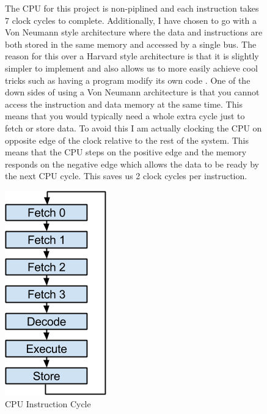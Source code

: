 \documentclass[10pt]{article}
\begin{document}
        \begin{figure}[H]
            \centering
            \begin{minipage}[t]{.7\textwidth}
                \vspace{0pt}
                The CPU for this project is non-piplined and each instruction
                takes 7 clock cycles to complete.  Additionally, I have chosen
                to go with a Von Neumann style architecture \cite{von} where
                the data and instructions are both stored in the same memory
                and accessed by a single bus. The reason for this over a
                Harvard style architecture \cite{harvard} is that it is
                slightly simpler to implement and also allows us to more easily
                achieve cool tricks such as having a program modify its own
                code \cite{modify}. One of the down sides of using a Von
                Neumann architecture is that you cannot access the instruction
                and data memory at the same time. This means that you would
                typically need a whole extra cycle just to fetch or store data.
                To avoid this I am actually clocking the CPU on opposite edge
                of the clock relative to the rest of the system.  This means
                that the CPU steps on the positive edge and the memory responds
                on the negative edge which allows the data to be ready by the
                next CPU cycle. This saves us 2 clock cycles per instruction.
            \end{minipage}%
            \begin{minipage}[t]{.3\textwidth}
                \vspace{0pt}
                \centering
                \includegraphics[width=0.5\linewidth]{./instruction_cycle.png}
                \caption{CPU Instruction Cycle}
            \end{minipage}
        \end{figure}
\end{document}
